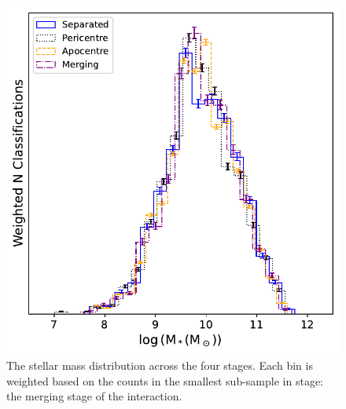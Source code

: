 \begin{figure}
    \centering
    \includegraphics[width = \textwidth]{Chapter3/figures/stellar-mass-dist.pdf}
    \caption[The stellar mass distribution across the four stages.]{The stellar mass distribution across the four stages. Each bin is weighted based on the counts in the smallest sub-sample in stage: the merging stage of the interaction.}
    \label{fig:weighted-mass}
\end{figure}

